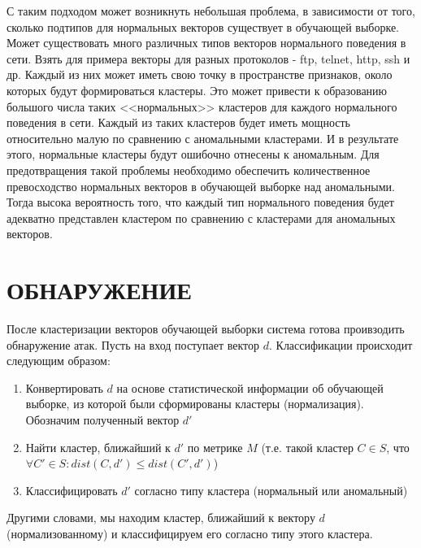 \documentclass[12pt,a4paper]{article}
\begin{document}
С таким подходом может возникнуть небольшая проблема, в зависимости от того,
сколько подтипов для нормальных векторов существует в обучающей выборке.
Может существовать много различных типов векторов нормального поведения
в сети. Взять для примера векторы для разных протоколов - ftp, telnet, http, ssh и др.
Каждый из них может иметь свою точку в пространстве признаков, около которых
будут формироваться кластеры. Это может привести к образованию большого
числа таких <<нормальных>> кластеров для каждого нормального поведения в сети.
Каждый из таких кластеров будет иметь мощность относительно малую по сравнению с 
аномальными кластерами. И в результате этого, нормальные кластеры будут ошибочно
отнесены к аномальным. Для предотвращения такой проблемы необходимо обеспечить
количественное превосходство нормальных векторов в обучающей выборке над
аномальными. Тогда высока вероятность того, что каждый тип нормального поведения
будет адекватно представлен кластером по сравнению с кластерами для аномальных
векторов.

\section{ОБНАРУЖЕНИЕ}

После кластеризации векторов обучающей выборки система готова проивзодить
обнаружение атак. Пусть на вход поступает вектор $d$. Классификации происходит
следующим образом:

\begin{enumerate}

\item Конвертировать $d$ на основе статистической информации об обучающей выборке,
из которой были сформированы кластеры (нормализация). Обозначим полученный вектор $d'$

\item Найти кластер, ближайший к $d'$ по метрике $M$ (т.е. такой кластер $C \in S$, что
$\forall C' \in S : dist(C, d') \leq dist(C',d')$)

\item Классифицировать $d'$ согласно типу кластера (нормальный или аномальный)

\end{enumerate}

Другими словами, мы находим кластер, ближайший к вектору $d$ (нормализованному) и
классифицируем его согласно типу этого кластера.
\end{document}
